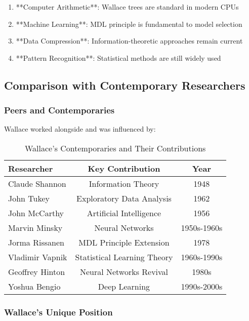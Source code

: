 \begin{enumerate}
    \item **Computer Arithmetic**: Wallace trees are standard in modern CPUs
    \item **Machine Learning**: MDL principle is fundamental to model selection
    \item **Data Compression**: Information-theoretic approaches remain current
    \item **Pattern Recognition**: Statistical methods are still widely used
\end{enumerate}

\subsection{Comparison with Contemporary Researchers}

\subsubsection{Peers and Contemporaries}

Wallace worked alongside and was influenced by:

\begin{table}[h!]
\centering
\caption{Wallace's Contemporaries and Their Contributions}
\begin{tabular}{@{}lcc@{}}
\toprule
Researcher & Key Contribution & Year \\
\midrule
Claude Shannon & Information Theory & 1948 \\
John Tukey & Exploratory Data Analysis & 1962 \\
John McCarthy & Artificial Intelligence & 1956 \\
Marvin Minsky & Neural Networks & 1950s-1960s \\
Jorma Rissanen & MDL Principle Extension & 1978 \\
Vladimir Vapnik & Statistical Learning Theory & 1960s-1990s \\
Geoffrey Hinton & Neural Networks Revival & 1980s \\
Yoshua Bengio & Deep Learning & 1990s-2000s \\
\midrule
\end{tabular}
\end{table}

\subsubsection{Wallace's Unique Position}


